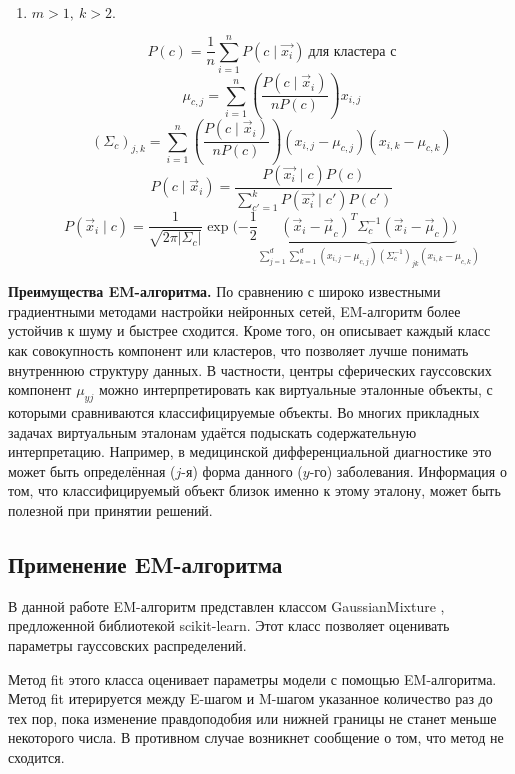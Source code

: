 \begin{enumerate}
    \item
    $m > 1, \ k > 2.$

    $$P(c) = \frac{1}{n} \sum_{i=1}^n P(c \mid  \vec{x_i}) \ \text{для кластера с}$$
    $$\mu_{c, j}=\sum_{i=1}^{n}\left(\frac{P\left(c \mid \vec{x}_{i}\right)}{n P(c)}\right) x_{i, j}$$
    $$\left(\Sigma_{c}\right)_{j, k}=\sum_{i=1}^{n}\left(\frac{P\left(c \mid \vec{x}_{i}\right)}{n P(c)}\right)\left(x_{i, j}-\mu_{c, j}\right)\left(x_{i, k}-\mu_{c, k}\right)$$
    $$P(c \mid \vec{x}_i) = \frac{P(\vec{x_i} \mid c)P(c)}{\sum_{c'=1}^k P(\vec{x_i} \mid c')P(c')}$$
    $$P\left(\vec{x}_{i} \mid c\right)=\frac{1}{\sqrt{2 \pi\left|\Sigma_{c}\right|}} \exp (-\frac{1}{2} \underbrace{\left(\vec{x}_{i}-\vec{\mu}_{c}\right)^{T}\Sigma_{c}^{-1}\left(\vec{x}_{i}-\vec{\mu}_{c}\right))}_{\sum_{j=1}^{d} \sum_{k=1}^{d}\left(x_{i, j}-\mu_{c, j}\right)\left(\Sigma_{c}^{-1}\right)_{j k}\left(x_{i, k}-\mu_{c, k}\right)}$$
    \end{enumerate}

    \vspace{\baselineskip}
    \textbf{Преимущества EM-алгоритма.} По сравнению с широко известными градиентными методами настройки нейронных сетей, EM-алгоритм более устойчив к шуму и быстрее сходится. Кроме того, он описывает каждый класс как совокупность компонент или кластеров, что позволяет лучше понимать внутреннюю структуру данных. В частности, центры сферических гауссовских компонент $\mu_{yj}$ можно интерпретировать как виртуальные эталонные объекты, с которыми сравниваются классифицируемые объекты. Во многих прикладных задачах виртуальным эталонам удаётся подыскать содержательную интерпретацию. Например, в медицинской дифференциальной диагностике это может быть определённая ($j$-я) форма данного ($y$-го) заболевания. Информация о том, что классифицируемый объект близок именно к этому эталону, может быть полезной при принятии решений.

\newpage
\subsection{Применение EM-алгоритма}

В данной работе EM-алгоритм представлен классом GaussianMixture \cite{sixth}, предложенной библиотекой scikit-learn. Этот класс позволяет оценивать параметры гауссовских распределений.

Метод fit этого класса оценивает параметры модели с помощью EM-алгоритма. Метод fit итерируется между E-шагом и M-шагом указанное количество раз до тех пор, пока изменение правдоподобия или нижней границы не станет меньше некоторого числа. В противном случае возникнет сообщение о том, что метод не сходится.

